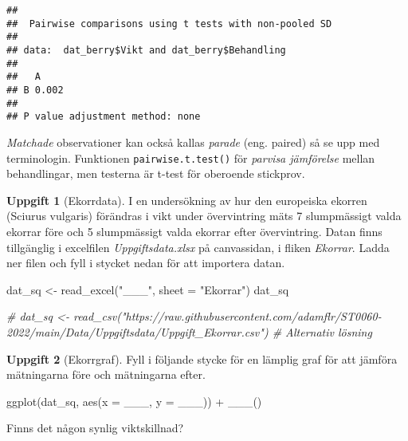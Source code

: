 \documentclass[
]{book}
\newenvironment{Shaded}{\begin{snugshade}}{\end{snugshade}}
\newcommand{\AttributeTok}[1]{\textcolor[rgb]{0.77,0.63,0.00}{#1}}
\newcommand{\CommentTok}[1]{\textcolor[rgb]{0.56,0.35,0.01}{\textit{#1}}}
\newcommand{\FunctionTok}[1]{\textcolor[rgb]{0.00,0.00,0.00}{#1}}
\newcommand{\NormalTok}[1]{#1}
\newcommand{\OtherTok}[1]{\textcolor[rgb]{0.56,0.35,0.01}{#1}}
\newcommand{\SpecialCharTok}[1]{\textcolor[rgb]{0.00,0.00,0.00}{#1}}
\newcommand{\StringTok}[1]{\textcolor[rgb]{0.31,0.60,0.02}{#1}}
\theoremstyle{definition}
\theoremstyle{definition}
\theoremstyle{definition}
\newtheorem{exercise}{Uppgift}[chapter]
\theoremstyle{definition}
\theoremstyle{remark}
\begin{document}
\begin{Shaded}
\end{Shaded}

\begin{verbatim}
## 
##  Pairwise comparisons using t tests with non-pooled SD 
## 
## data:  dat_berry$Vikt and dat_berry$Behandling 
## 
##   A    
## B 0.002
## 
## P value adjustment method: none
\end{verbatim}

\emph{Matchade} observationer kan också kallas \emph{parade} (eng. paired) så se upp med terminologin. Funktionen \texttt{pairwise.t.test()} för \emph{parvisa jämförelse} mellan behandlingar, men testerna är t-test för oberoende stickprov.

\begin{exercise}[Ekorrdata]

I en undersökning av hur den europeiska ekorren (Sciurus vulgaris) förändras i vikt under övervintring mäts 7 slumpmässigt valda ekorrar före och 5 slumpmässigt valda ekorrar efter övervintring. Datan finns tillgänglig i excelfilen \emph{Uppgiftsdata.xlsx} på canvassidan, i fliken \emph{Ekorrar}. Ladda ner filen och fyll i stycket nedan för att importera datan.

\begin{Shaded}
\begin{Highlighting}[]
\NormalTok{dat\_sq }\OtherTok{\textless{}{-}} \FunctionTok{read\_excel}\NormalTok{(}\StringTok{"\_\_\_"}\NormalTok{, }\AttributeTok{sheet =} \StringTok{"Ekorrar"}\NormalTok{)}
\NormalTok{dat\_sq}

\CommentTok{\# dat\_sq \textless{}{-} read\_csv("https://raw.githubusercontent.com/adamflr/ST0060{-}2022/main/Data/Uppgiftsdata/Uppgift\_Ekorrar.csv") \# Alternativ lösning}
\end{Highlighting}
\end{Shaded}

\end{exercise}

\begin{exercise}[Ekorrgraf]
Fyll i följande stycke för en lämplig graf för att jämföra mätningarna före och mätningarna efter.

\begin{Shaded}
\begin{Highlighting}[]
\FunctionTok{ggplot}\NormalTok{(dat\_sq, }\FunctionTok{aes}\NormalTok{(}\AttributeTok{x =}\NormalTok{ \_\_\_, }\AttributeTok{y =}\NormalTok{ \_\_\_)) }\SpecialCharTok{+}
  \FunctionTok{\_\_\_}\NormalTok{()}
\end{Highlighting}
\end{Shaded}

Finns det någon synlig viktskillnad?
\end{exercise}
\end{document}
